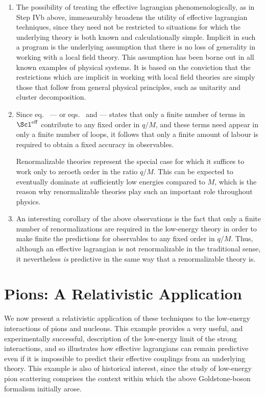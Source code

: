 \documentclass[12pt,epsf]{report}
\def\leff{\Scl^{\rm eff}}
\begin{document}
\begin{enumerate}

\item
The possibility of treating the effective lagrangian
phenomenologically, as in Step IVb above, immeasurably
broadens the utility of effective lagrangian techniques,
since they need not be restricted to situations for which
the underlying theory is both known and calculationally
simple. Implicit in such a program is the underlying
assumption that there is no loss of generality in working
with a local field theory. This assumption has been borne
out in all known examples of physical systems. It is based
on the conviction that the restrictions which are implicit
in working with local field theories are simply those that
follow from general physical principles, such as unitarity
and cluster decomposition.

\item
Since eq.~ --- or 
eqs.~ and 
 --- states that only a finite
number of terms in $\leff$ contribute to any fixed order in
$q/M$, and these terms need appear in only a finite number
of loops, it follows that only a finite amount of labour is
required to obtain a fixed accuracy in observables.

Renormalizable theories represent the special case for
which it suffices to work only to zeroeth order in the
ratio $q/M$. This can be expected to eventually
dominate at sufficiently low energies compared to
$M$, which is the reason why renormalizable 
theories play such an important role throughout 
physics.

\item
An interesting corollary of the above observations is the
fact that only a finite number of renormalizations are
required in the low-energy theory in order to make finite
the predictions for observables to any fixed order in
$q/M$. Thus, although an effective lagrangian is not
renormalizable in the traditional sense, it nevertheless
{\em is} predictive in the same way that a renormalizable
theory is.

\end{enumerate}


\chapter{Pions: A Relativistic Application}

We now present a relativistic application of these
techniques to the low-energy interactions of pions and
nucleons. This example provides a very useful, and
experimentally successful, description of the low-energy
limit of the strong interactions, and so illustrates how
effective lagrangians can remain predictive even if it is
impossible to predict their effective couplings from an
underlying theory. This example is also of historical
interest, since the study of low-energy pion scattering
comprises the context within which the above
Goldstone-boson formalism initially arose.
\end{document}
